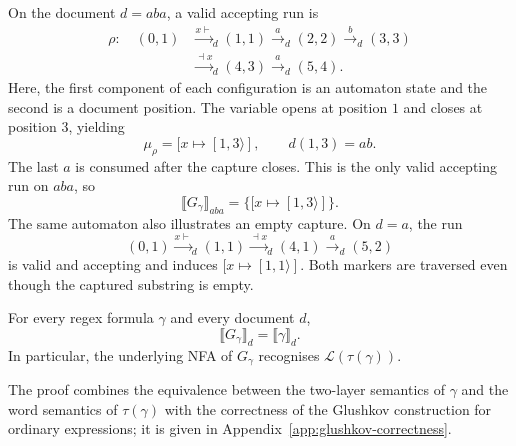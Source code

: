 \begin{example}
On the document $d=aba$, a valid accepting run is
\[
\begin{aligned}
 \rho:\quad
 (0,1)&\xrightarrow{x\vdash}_d(1,1)
       \xrightarrow{a}_d(2,2)
       \xrightarrow{b}_d(3,3)\\
      &\xrightarrow{\dashv x}_d(4,3)
       \xrightarrow{a}_d(5,4).
\end{aligned}
\]
Here, the first component of each configuration is an automaton state and
the second is a document position. The variable opens at position $1$ and
closes at position $3$, yielding
\[
 \mu_\rho=[x\mapsto[1,3\rangle],\qquad d(1,3)=ab.
\]
The last $a$ is consumed after the capture closes. This is the only valid
accepting run on $aba$, so
\[
 \llbracket G_\gamma\rrbracket_{aba}=\{[x\mapsto[1,3\rangle]\}.
\]
The same automaton also illustrates an empty capture. On $d=a$, the run
\[
 (0,1)\xrightarrow{x\vdash}_d(1,1)
       \xrightarrow{\dashv x}_d(4,1)
       \xrightarrow{a}_d(5,2)
\]
is valid and accepting and induces $[x\mapsto[1,1\rangle]$.
Both markers are traversed even though the captured substring is empty.
\end{example}

\begin{theorem}
\label{theo:glushkov-correct}
For every regex formula $\gamma$ and every document $d$,
\[
  \llbracket G_\gamma\rrbracket_d = \llbracket\gamma\rrbracket_d.
\]
In particular, the underlying NFA of $G_\gamma$ recognises
$\mathcal L(\tau(\gamma))$.
\end{theorem}
The proof combines the equivalence between the two-layer semantics of
$\gamma$ and the word semantics of $\tau(\gamma)$ with the correctness
of the Glushkov construction for ordinary expressions; it is given in
Appendix~\ref{app:glushkov-correctness}.

